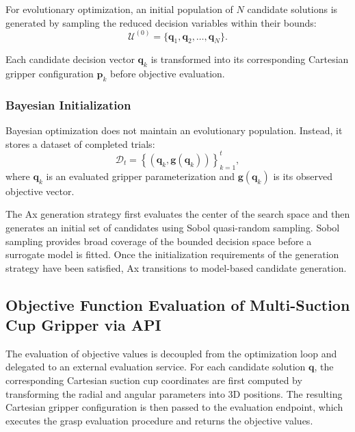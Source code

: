 For evolutionary optimization, an initial population of $N$ candidate solutions is generated by
sampling the reduced decision variables within their bounds:
\begin{equation}
    \mathcal{U}^{(0)}
    =
    \{\mathbf{q}_1,\mathbf{q}_2,\dots,\mathbf{q}_N\}.
\end{equation}

Each candidate decision vector $\mathbf{q}_k$ is transformed into its corresponding Cartesian
gripper configuration $\mathbf{p}_k$ before objective evaluation.

\subsubsection{Bayesian Initialization}

Bayesian optimization does not maintain an evolutionary population. Instead, it stores a dataset of
completed trials:
\begin{equation}
    \mathcal{D}_t =
    \left\{
        \left(\mathbf{q}_k,\mathbf{g}(\mathbf{q}_k)\right)
    \right\}_{k=1}^{t},
\end{equation}
where $\mathbf{q}_k$ is an evaluated gripper parameterization and $\mathbf{g}(\mathbf{q}_k)$ is its
observed objective vector. 

The Ax generation strategy first evaluates the center of the search space and then generates an
initial set of candidates using Sobol quasi-random sampling. Sobol sampling provides broad coverage
of the bounded decision space before a surrogate model is fitted. Once the initialization
requirements of the generation strategy have been satisfied, Ax transitions to model-based candidate
generation.

\subsection{Objective Function Evaluation of Multi-Suction Cup Gripper via API}

The evaluation of objective values is decoupled from the optimization loop and delegated to an
external evaluation service. For each candidate solution $\mathbf{q}$, the corresponding Cartesian
suction cup coordinates are first computed by transforming the radial and angular parameters into 3D
positions. The resulting Cartesian gripper configuration is then passed to the evaluation endpoint,
which executes the grasp evaluation procedure and returns the objective values.

